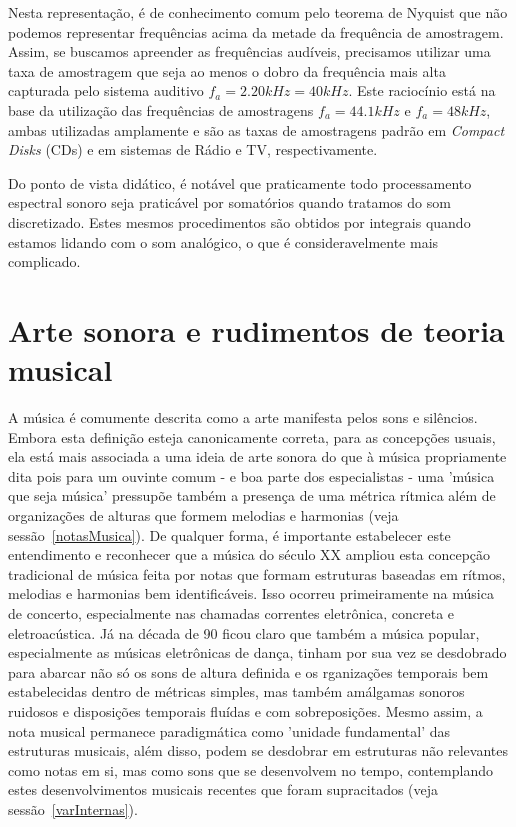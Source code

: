 Nesta representação, é de conhecimento comum pelo teorema de Nyquist que não podemos representar frequências acima da metade da frequência de amostragem. Assim, se buscamos apreender as frequências audíveis, precisamos utilizar uma taxa de amostragem que seja ao menos o dobro da frequência mais alta capturada pelo sistema auditivo $f_a=2.20kHz=40kHz$. Este raciocínio está na base da utilização das frequências de amostragens $f_a=44.1kHz$ e $f_a=48kHz$, ambas utilizadas amplamente e são as taxas de amostragens padrão em \emph{Compact Disks} (CDs) e em sistemas de Rádio e TV, respectivamente.

Do ponto de vista didático, é notável que praticamente todo processamento espectral sonoro seja praticável por somatórios quando tratamos do som discretizado. Estes mesmos procedimentos são obtidos por integrais quando estamos lidando com o som analógico, o que é consideravelmente mais complicado.




    \section{Arte sonora e rudimentos de teoria musical}

A música é comumente descrita como a arte manifesta pelos sons e silêncios. Embora esta definição esteja canonicamente correta, para as concepções usuais, ela está mais associada a uma ideia de arte sonora do que à música propriamente dita pois para um ouvinte comum - e boa parte dos especialistas - uma 'música que seja música' pressupõe também a presença de uma métrica rítmica além de organizações de alturas que formem melodias e harmonias (veja sessão~\ref{notasMusica}). De qualquer forma, é importante estabelecer este entendimento e reconhecer que a música do século XX ampliou esta concepção tradicional de música feita por notas que formam estruturas baseadas em rítmos, melodias e harmonias bem identificáveis. Isso ocorreu primeiramente na música de concerto, especialmente nas chamadas correntes eletrônica, concreta e eletroacústica. Já na década de 90 ficou claro que também a música popular, especialmente as músicas eletrônicas de dança, tinham por sua vez se desdobrado para abarcar não só os sons de altura definida e os rganizações temporais bem estabelecidas dentro de métricas simples, mas também amálgamas sonoros ruidosos e disposições temporais fluídas e com sobreposições. Mesmo assim, a nota musical permanece paradigmática como 'unidade fundamental' das estruturas musicais, além disso, podem se desdobrar em estruturas não relevantes como notas em si, mas como sons que se desenvolvem no tempo, contemplando estes desenvolvimentos musicais recentes que foram supracitados (veja sessão~\ref{varInternas}).


